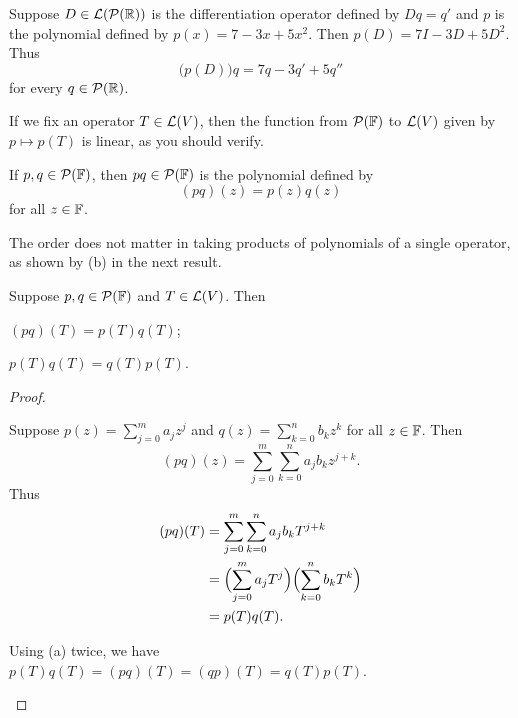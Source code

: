 \begin{example}\label{ax:5.15}
Suppose $D\in\mathcal{L}(\mathcal{P}(\mathbb{R}))$ is the differentiation operator defined by
$Dq=q'$ and $p$ is the polynomial defined by $p(x)=7-3x+5x^2$. Then
$p(D)=7I-3D+5D^2$. Thus
\[ \bigl(p(D)\bigr)q = 7q-3q'+5q'' \]
for every $q\in\mathcal{P}(\mathbb{R})$.
\end{example}

If we fix an operator $T\in\mathcal{L}(V)$, then the function from $\mathcal{P}(\mathbb{F})$ to
$\mathcal{L}(V)$ given by $p\mapsto p(T)$ is linear, as you should verify.

\begin{definition}\label{ax:5.16}
If $p,q\in\mathcal{P}(\mathbb{F})$, then $pq\in\mathcal{P}(\mathbb{F})$ is the polynomial defined by
\[ (pq)(z) = p(z)q(z) \]
for all $z\in\mathbb{F}$.
\end{definition}

%
The order does not matter in taking products of polynomials of a single
operator, as shown by (b) in the next result.

\begin{result}\label{ax:5.17}
Suppose $p,q\in\mathcal{P}(\mathbb{F})$ and $T\in\mathcal{L}(V)$. Then
\begin{parts}
\item $(pq)(T)=p(T)q(T)$;
\item $p(T)q(T)=q(T)p(T)$.
\end{parts}
\end{result}

\begin{proof}
\begin{parts}
\item Suppose $p(z)=\sum_{j=0}^m a_jz^j$ and $q(z)=\sum_{k=0}^n b_kz^k$ for
  all $z\in\mathbb{F}$. Then
  \[ (pq)(z) = \sum_{j=0}^m\sum_{k=0}^n a_jb_kz^{j+k}. \]
  Thus
  \begin{align*}
  (pq)(T) &= \sum_{j=0}^m\sum_{k=0}^n a_jb_kT^{j+k}\\
          &= \Bigl(\sum_{j=0}^m a_jT^j\Bigr)\Bigl(\sum_{k=0}^n b_kT^k\Bigr)\\
          &= p(T)q(T).
  \end{align*}
\item Using (a) twice, we have $p(T)q(T)=(pq)(T)=(qp)(T)=q(T)p(T)$.
  \qedhere
\end{parts}
\end{proof}

